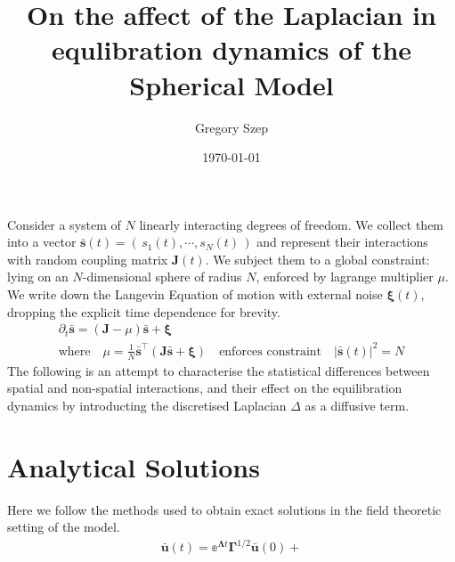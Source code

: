 \documentclass{article}[12pt]
\numberwithin{equation}{section}
\begin{document}
\title{
On the affect of the Laplacian in equlibration
dynamics of the Spherical Model
}

\author{Gregory Szep}
\date{\today}

\maketitle
Consider a system of $N$ linearly interacting degrees of freedom. We collect
them into a vector $\mathbf{\bar s}(t) = \left(\,s_1(t),\cdots, s_N(t)\,\right)$
and represent their interactions with random coupling matrix $\mathbf{J}(t)$.
We subject them to a global constraint: lying on an $N$-dimensional sphere of
radius $N$, enforced by lagrange multiplier $\mu$. We write down the
Langevin Equation of motion with external noise $\boldsymbol\xi(t)$, dropping
the explicit time dependence for brevity.
\begin{gather}
\partial_t\mathbf{\bar s} = (\mathbf{J}-\mu)\mathbf{\bar s}+\boldsymbol\xi\quad\\
\text{where}\quad\mu = \frac{1}{N}\mathbf{\bar s}^{\top}\left(\mathbf{J}\mathbf{\bar s}+\boldsymbol\xi\right)\quad\text{enforces constraint}\quad|\mathbf{\bar s}(t)|^2=N
\end{gather}
The following is an attempt to characterise the statistical differences between
spatial and non-spatial interactions, and their effect on the equilibration
dynamics by introducting the discretised Laplacian $\Delta$ as a diffusive term.

\section{Analytical Solutions}
Here we follow the methods used to obtain exact solutions\cite{} in the
field theoretic setting of the model.
\begin{align*}
  \mathbf{\bar u}(t)=\mathbb{e}^{\mathbf{\Lambda}t}\mathbf\Gamma^{1/2}\mathbf{\bar u}(0)
  +
\end{align*}
\end{document}
